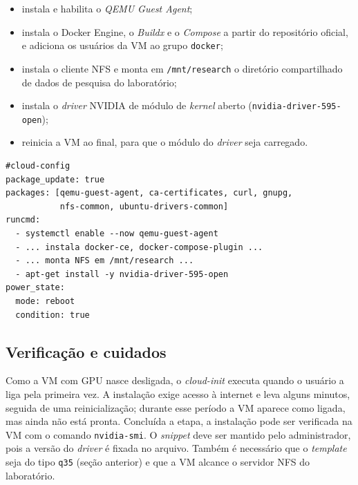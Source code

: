 \begin{itemize}
    \item instala e habilita o \textit{QEMU Guest Agent};
    \item instala o Docker Engine, o \textit{Buildx} e o \textit{Compose} a partir do repositório oficial, e adiciona os usuários da VM ao grupo \texttt{docker};
    \item instala o cliente NFS e monta em \texttt{/mnt/research} o diretório compartilhado de dados de pesquisa do laboratório;
    \item instala o \textit{driver} NVIDIA de módulo de \textit{kernel} aberto (\texttt{nvidia-driver-595-open});
    \item reinicia a VM ao final, para que o módulo do \textit{driver} seja carregado.
\end{itemize}

\medskip
\noindent\begin{minipage}{\textwidth}
\footnotesize
\begin{verbatim}
#cloud-config
package_update: true
packages: [qemu-guest-agent, ca-certificates, curl, gnupg,
           nfs-common, ubuntu-drivers-common]
runcmd:
  - systemctl enable --now qemu-guest-agent
  - ... instala docker-ce, docker-compose-plugin ...
  - ... monta NFS em /mnt/research ...
  - apt-get install -y nvidia-driver-595-open
power_state:
  mode: reboot
  condition: true
\end{verbatim}
\end{minipage}
\medskip

\subsection{Verificação e cuidados}

Como a VM com GPU nasce desligada, o \textit{cloud-init} executa quando o usuário a liga pela primeira vez. A instalação exige acesso à internet e leva alguns minutos, seguida de uma reinicialização; durante esse período a VM aparece como ligada, mas ainda não está pronta. Concluída a etapa, a instalação pode ser verificada na VM com o comando \texttt{nvidia-smi}. O \textit{snippet} deve ser mantido pelo administrador, pois a versão do \textit{driver} é fixada no arquivo. Também é necessário que o \textit{template} seja do tipo \texttt{q35} (seção anterior) e que a VM alcance o servidor NFS do laboratório.
